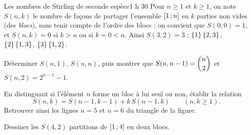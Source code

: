 

\begin{defi}{Les nombres de Stirling de seconde espèce}{1 h 30}
Pour $n\geqslant1$ et $k\geqslant1$, on note $S(n,k)$ le nombre de façons de
partager l'ensemble $\mathopen{[}1\,{;}\,n\mathclose{]}$ en $k$ parties non vides (des
\emph{blocs}), sans tenir compte de l'ordre des blocs ; on convient que
$S(0,0)=1$, et $S(n,k)=0$ si $k>n$ ou si $k=0<n$. Ainsi $S(3,2)=3$ :
$\left\{1\right\}\left\{2,3\right\}$, $\left\{2\right\}\left\{1,3\right\}$, $\left\{3\right\}\left\{1,2\right\}$.

\begin{questions}
  \item Déterminer $S(n,1)$, $S(n,n)$, puis montrer que
    $S(n,n-1)=\dbinom n2$ et $S(n,2)=2^{n-1}-1$.
  \item En distinguant si l'élément $n$ forme un bloc à lui seul ou non,
    établir la relation
    \[
    S(n,k)=S(n-1,k-1)+k\,S(n-1,k)\qquad(n,k\geqslant1).
    \]
    Retrouver ainsi les lignes $n=5$ et $n=6$ du triangle de la figure.
  \item Dessiner les $S(4,2)$ partitions de $\mathopen{[}1\,{;}\,4\mathclose{]}$ en deux blocs.
\end{questions}

\medskip
\begin{center}
\\[0.5mm]
\end{center}


\end{defi}

